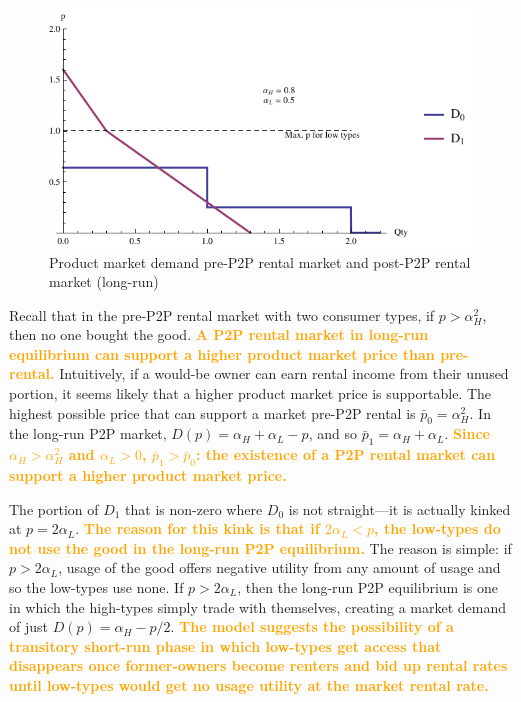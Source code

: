 \documentclass[11pt]{article}
\newcommand{\important}[1]{\textcolor{orange}{\textbf{#1}}}
\newcommand{\important}[1]{#1}
\begin{document}
\begin{figure}
\caption{Product market demand pre-P2P rental market and post-P2P rental market (long-run)}
\label{fig:demand} 
\centering
\includegraphics[scale = 1]{./diagrams/p2plr_demand.pdf}
\end{figure} 

Recall that in the pre-P2P rental market with two consumer types, if $p > \alpha_H^2$, then no one bought the good. 
\important{A P2P rental market in long-run equilibrium can support a higher product market price than pre-rental.}  
Intuitively, if a would-be owner can earn rental income from their unused portion, it seems likely that a higher product market price is supportable. 
The highest possible price that can support a market pre-P2P rental is $\bar{p}_0 = \alpha_H^2$.  
In the long-run P2P market, $D(p) = \alpha_H + \alpha_L - p$, and so $\bar{p}_{1} = \alpha_H + \alpha_L$. 
\important{Since $\alpha_H > \alpha_H^2$ and $\alpha_L > 0$, $\bar{p}_1 > \bar{p}_0$: the existence of a P2P rental market can support a higher product market price.} 

The portion of $D_1$ that is non-zero where $D_0$ is not straight---it is actually kinked at $p = 2\alpha_L$. 
\important{The reason for this kink is that if $2\alpha_L < p$, the low-types do not use the good in the long-run P2P equilibrium.} 
The reason is simple: if $p > 2\alpha_L$, usage of the good offers negative utility from any amount of usage and so the low-types use none. 
If $p > 2 \alpha_L$, then the long-run P2P equilibrium is one in which the high-types simply trade with themselves, creating a market demand of just $D(p) = \alpha_H - p/2$. 
\important{The model suggests the possibility of a transitory short-run phase in which low-types get access that disappears once former-owners become renters and bid up rental rates until low-types would get no usage utility at the market rental rate.} 
\end{document}
